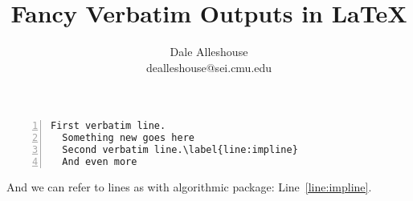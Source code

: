 \documentclass{article}
\makeatletter
\newcommand{\email}{dealleshouse@sei.cmu.edu}
\newcommand{\me}{Dale Alleshouse}
\makeatother
\begin{document}
\title{Fancy Verbatim Outputs in \LaTeX}
\author{\me\\\email}
\maketitle

\begin{Verbatim}[frame=single, label=One Hot Program, numbers=left, commandchars=\\\{\}]
  First verbatim line.
  Something new goes here
  Second verbatim line.\label{line:impline}
  And even more
\end{Verbatim}


And we can refer to lines as with algorithmic package: Line~\ref{line:impline}.
\end{document}
